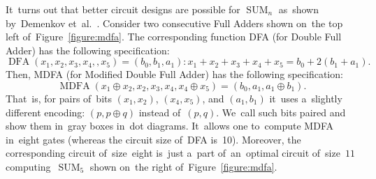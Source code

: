 \documentclass[a4paper, UKenglish, cleveref, autoref,  thm-restate, anonymous]{lipics-v2021}
\DeclareMathOperator{\SUM}{SUM}
\DeclareMathOperator{\MDFA}{MDFA}
\begin{document}
    It~turns out that better circuit designs are possible for $\SUM_n$
    as~shown by~Demenkov et~al.~\cite{DBLP:journals/ipl/DemenkovKKY10}.
    Consider two consecutive Full Adders shown on~the top left of~Figure~\ref{figure:mdfa}. The corresponding function DFA (for Double Full Adder) has the following specification: \[\operatorname{DFA}(x_1, x_2,x_3,x_4,,x_5)=(b_0,b_1,a_1) \colon x_1+x_2+x_3+x_4+x_5=b_0+2(b_1+a_1).\]
    Then, MDFA (for Modified Double Full Adder) has the following specification:
    \[\MDFA(x_1 \oplus x_2, x_2, x_3, x_4, x_4 \oplus x_5)=(b_0, a_1, a_1 \oplus b_1).\]
    That~is, for pairs of~bits $(x_1, x_2)$, $(x_4, x_5)$, and $(a_1, b_1)$
    it~uses a~slightly different encoding: $(p, p \oplus q)$ instead of~$(p,q)$.
    We~call such bits paired and show them in~gray boxes in~dot diagrams.
    It~allows one to~compute MDFA in~eight gates (whereas the circuit size of~DFA is~10). Moreover, the corresponding circuit of~size~eight is~just a~part
    of~an~optimal circuit of~size~$11$ computing~$\SUM_5$ shown on~the right
    of~Figure~\ref{figure:mdfa}.
\end{document}

